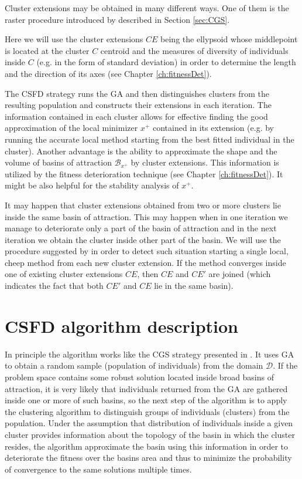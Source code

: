 Cluster extensions may be obtained in many different ways.
One of them is the raster procedure introduced by
\cite{Telega1999} described in Section \ref{sec:CGS}.

Here we will use the cluster extensions $CE$ being the ellypsoid
whose middlepoint is located at the cluster $C$ centroid
and the measures of diversity 
of individuals inside $C$ (e.g. in the form of standard deviation)
in order to determine the length and the direction of its axes
(see Chapter \ref{ch:fitnessDet}).

The CSFD strategy runs the GA and then distinguishes clusters from the resulting
population and constructs their extensions in each iteration.
The information contained in each cluster allows for 
effective finding the good approximation of the 
local minimizer $x^+$ contained in its extension
(e.g. by running the accurate local method starting from the best fitted
individual in the cluster).
Another advantage is the ability to approximate the shape and the volume of
basins of attraction $\mathcal{B}_{x^+}$ by cluster extensions.
This information is utilized by the fitness deterioration
technique (see Chapter \ref{ch:fitnessDet}). 
It might be also helpful for the stability analysis of $x^+$.



It may happen that cluster extensions obtained from two or more clusters
lie inside the same basin of attraction. This may happen when in one iteration
we manage to deteriorate only a part of the basin of attraction and in the next
iteration we obtain the cluster inside other part of the basin.  
We will use the procedure suggested by \cite{Telega1999} in order to detect
such situation starting a single local, cheep method from each new
cluster extension.
If the method converges inside one of existing cluster extensions $CE$,
then $CE$ and $CE'$ are joined
(which indicates the fact that both $CE'$ and $CE$ lie in
the same basin).

\section{CSFD algorithm description}
\label{sec:algDesc}

In principle the algorithm works like the CGS strategy  presented in 
\cite{SchaeferAdamskaTelega2004}. It uses GA to obtain
a random sample (population of individuals) from the domain $\mathcal{D}$.
If the problem space contains some robust solution located inside broad
basins of attraction, it is very likely that individuals returned from
the GA are gathered inside one or more of such basins, so the next step of the
algorithm is to apply the clustering algorithm to distinguish groups of
individuals (clusters) from the population. Under the assumption that
distribution of individuals inside a given cluster provides information
about the topology of the basin in which the cluster resides,
the algorithm approximate the basin using this information in order to 
deteriorate the fitness over the basins area
and thus to minimize the probability of convergence to the same solutions
multiple times.

